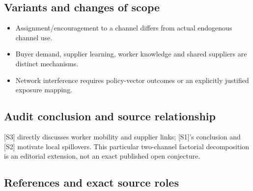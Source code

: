 \documentclass[11pt,a4paper]{article}
\begin{document}
\subsection*{Variants and changes of scope}

\begin{itemize}
\item Assignment/encouragement to a channel differs from actual endogenous channel use.
\item Buyer demand, supplier learning, worker knowledge and shared suppliers are distinct mechanisms.
\item Network interference requires policy-vector outcomes or an explicitly justified exposure mapping.
\end{itemize}

\subsection*{Audit conclusion and source relationship}

[S3] directly discusses worker mobility and supplier links; [S1]'s conclusion and [S2] motivate local spillovers. This particular two-channel factorial decomposition is an editorial extension, not an exact published open conjecture.

\subsection*{References and exact source roles}
\end{document}
